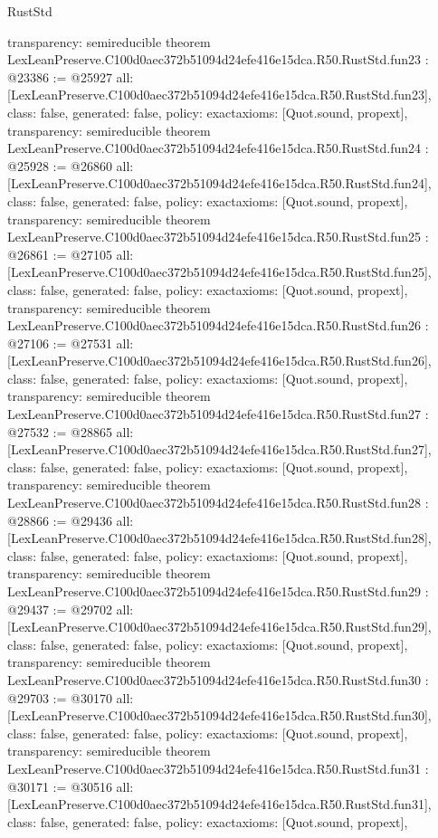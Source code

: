 \begin{lexlean}{RustStd}
\begin{coremodule}
{  transparency: semireducible
}
theorem LexLeanPreserve.C100d0aec372b51094d24efe416e15dca.R50.RustStd.fun23 : @23386 := @25927 {
  all: [LexLeanPreserve.C100d0aec372b51094d24efe416e15dca.R50.RustStd.fun23],
  class: false,
  generated: false,
  policy: exact{axioms: [Quot.sound, propext]},
  transparency: semireducible
}
theorem LexLeanPreserve.C100d0aec372b51094d24efe416e15dca.R50.RustStd.fun24 : @25928 := @26860 {
  all: [LexLeanPreserve.C100d0aec372b51094d24efe416e15dca.R50.RustStd.fun24],
  class: false,
  generated: false,
  policy: exact{axioms: [Quot.sound, propext]},
  transparency: semireducible
}
theorem LexLeanPreserve.C100d0aec372b51094d24efe416e15dca.R50.RustStd.fun25 : @26861 := @27105 {
  all: [LexLeanPreserve.C100d0aec372b51094d24efe416e15dca.R50.RustStd.fun25],
  class: false,
  generated: false,
  policy: exact{axioms: [Quot.sound, propext]},
  transparency: semireducible
}
theorem LexLeanPreserve.C100d0aec372b51094d24efe416e15dca.R50.RustStd.fun26 : @27106 := @27531 {
  all: [LexLeanPreserve.C100d0aec372b51094d24efe416e15dca.R50.RustStd.fun26],
  class: false,
  generated: false,
  policy: exact{axioms: [Quot.sound, propext]},
  transparency: semireducible
}
theorem LexLeanPreserve.C100d0aec372b51094d24efe416e15dca.R50.RustStd.fun27 : @27532 := @28865 {
  all: [LexLeanPreserve.C100d0aec372b51094d24efe416e15dca.R50.RustStd.fun27],
  class: false,
  generated: false,
  policy: exact{axioms: [Quot.sound, propext]},
  transparency: semireducible
}
theorem LexLeanPreserve.C100d0aec372b51094d24efe416e15dca.R50.RustStd.fun28 : @28866 := @29436 {
  all: [LexLeanPreserve.C100d0aec372b51094d24efe416e15dca.R50.RustStd.fun28],
  class: false,
  generated: false,
  policy: exact{axioms: [Quot.sound, propext]},
  transparency: semireducible
}
theorem LexLeanPreserve.C100d0aec372b51094d24efe416e15dca.R50.RustStd.fun29 : @29437 := @29702 {
  all: [LexLeanPreserve.C100d0aec372b51094d24efe416e15dca.R50.RustStd.fun29],
  class: false,
  generated: false,
  policy: exact{axioms: [Quot.sound, propext]},
  transparency: semireducible
}
theorem LexLeanPreserve.C100d0aec372b51094d24efe416e15dca.R50.RustStd.fun30 : @29703 := @30170 {
  all: [LexLeanPreserve.C100d0aec372b51094d24efe416e15dca.R50.RustStd.fun30],
  class: false,
  generated: false,
  policy: exact{axioms: [Quot.sound, propext]},
  transparency: semireducible
}
theorem LexLeanPreserve.C100d0aec372b51094d24efe416e15dca.R50.RustStd.fun31 : @30171 := @30516 {
  all: [LexLeanPreserve.C100d0aec372b51094d24efe416e15dca.R50.RustStd.fun31],
  class: false,
  generated: false,
  policy: exact{axioms: [Quot.sound, propext]},
}
\end{coremodule}
\end{lexlean}
